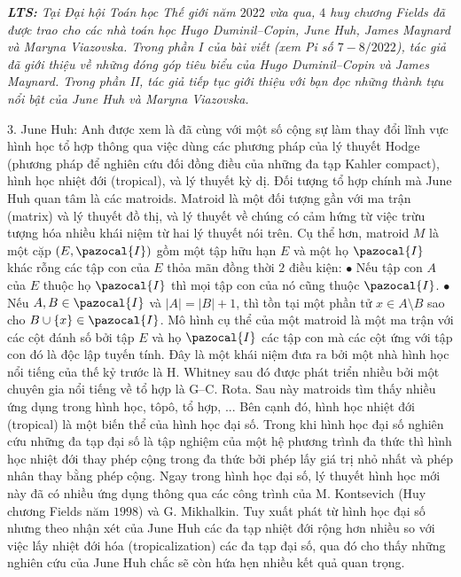 \textit{\textbf{\color{duongvaotoanhoc}LTS: }Tại Đại hội Toán học Thế giới năm $2022$ vừa qua, $4$ huy chương Fields đã được trao cho các nhà toán học Hugo Duminil--Copin, June Huh, James Maynard và Maryna Viazovska. Trong phần I của bài viết (xem Pi số $7-8/2022$), tác giả đã giới thiệu về những đóng góp tiêu biểu của  Hugo Duminil--Copin và James Maynard. Trong phần II, tác giả tiếp tục giới thiệu với bạn đọc những thành tựu nổi bật của June Huh và Maryna Viazovska.}
\begin{multicols}{2}	
	$3.$ June Huh: Anh được xem là đã cùng với một số cộng sự làm thay đổi lĩnh vực hình học tổ hợp thông qua việc dùng các phương pháp của lý thuyết Hodge (phương pháp để nghiên cứu đối đồng điều của những đa tạp Kahler compact), hình học nhiệt đới (tropical), và lý thuyết kỳ dị. Đối tượng tổ hợp chính mà June Huh quan tâm là các matroids. Matroid là một đối tượng gần với ma trận (matrix) và lý thuyết đồ thị, và lý thuyết về chúng có cảm hứng từ việc trừu tượng hóa nhiều khái niệm từ hai lý thuyết nói trên. Cụ thể hơn, matroid $M$ là một cặp $(E,\pazocal{I})$ gồm một tập hữu hạn $E$ và một họ $\pazocal{I}$ khác rỗng các tập con của $E$ thỏa mãn đồng thời $2$ điều kiện:
	\vskip 0.05cm
	$\bullet$ Nếu tập con $A$ của $E$ thuộc họ $\pazocal{I}$ thì mọi tập con của nó cũng thuộc $\pazocal{I}$.
	\vskip 0.05cm
	$\bullet$ Nếu $A, B \in \pazocal{I}$ và $|A| = |B| +1$, thì tồn tại một phần tử $x \in A \setminus B$ sao cho $B \cup \{x\} \in \pazocal{I}$.
	\vskip 0.05cm
	Mô hình cụ thể của một matroid là một ma trận với các cột đánh số bởi tập $E$ và họ $\pazocal{I}$ các tập con mà các cột ứng với tập con đó là độc lập tuyến tính.
	\vskip 0.05cm
	Đây là một khái niệm đưa ra bởi một nhà hình học nổi tiếng của thế kỷ trước là H. Whitney sau đó được phát triển nhiều bởi một chuyên gia nổi tiếng về tổ hợp là G--C. Rota. Sau này matroids tìm thấy nhiều ứng dụng trong hình học, tôpô, tổ hợp, ...
	\vskip 0.05cm
	Bên cạnh đó, hình học nhiệt đới (tropical) là một biến thể của hình học đại số. Trong khi hình học đại số nghiên cứu những đa tạp đại số là tập nghiệm của một hệ phương trình đa thức thì hình học nhiệt đới thay phép cộng trong đa thức bởi phép lấy giá trị nhỏ nhất và phép nhân thay bằng phép cộng. Ngay trong hình học đại số, lý thuyết hình học mới này đã có nhiều ứng dụng thông qua các công trình của M. Kontsevich (Huy chương Fields năm $1998$) và G. Mikhalkin. Tuy xuất phát từ hình học đại số nhưng theo nhận xét của June Huh các đa tạp nhiệt đới rộng hơn nhiều so với việc lấy nhiệt đới hóa (tropicalization) các đa tạp đại số, qua đó cho thấy những nghiên cứu của June Huh chắc sẽ còn hứa hẹn nhiều kết quả quan trọng.  

\end{multicols}
